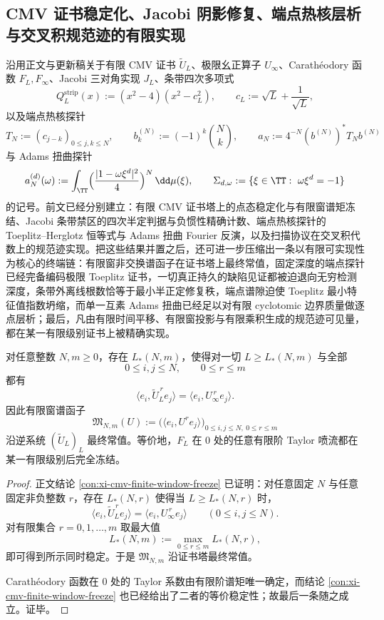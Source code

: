 \subsection{CMV 证书稳定化、Jacobi 阴影修复、端点热核层析与交叉积规范迹的有限实现}\label{subsec:conclusion-cmv-jacobi-adams-crossedproduct-finite-realization}
沿用正文与更新稿关于有限 CMV 证书 \(\widetilde U_L\)、极限幺正算子 \(U_\infty\)、Carath\'eodory 函数 \(F_L,F_\infty\)、Jacobi 三对角实现 \(J_L\)、条带四次多项式
\[
Q_L^{\mathrm{strip}}(x):=(x^2-4)(x^2-c_L^2),
\qquad
c_L:=\sqrt L+\frac1{\sqrt L},
\]
以及端点热核探针
\[
T_N:=(c_{j-k})_{0\le j,k\le N},
\qquad
b_k^{(N)}:=(-1)^k\binom Nk,
\qquad
a_N:=4^{-N}(b^{(N)})^\ast T_N b^{(N)}
\]
与 Adams 扭曲探针
\[
a_N^{(d)}(\omega)
:=
\int_{\TT}\Bigl(\frac{|1-\omega\xi^d|^2}{4}\Bigr)^N\,\dd\mu(\xi),
\qquad
\Sigma_{d,\omega}:=\{\xi\in\TT:\ \omega\xi^d=-1\}
\]
的记号。前文已经分别建立：有限 CMV 证书塔上的点态稳定化与有限窗谱矩冻结、Jacobi 条带禁区的四次半定判据与负惯性精确计数、端点热核探针的 Toeplitz--Herglotz 恒等式与 Adams 扭曲 Fourier 反演，以及扫描协议在交叉积代数上的规范迹实现。把这些结果并置之后，还可进一步压缩出一条以有限可实现性为核心的终端链：有限窗非交换谱函子在证书塔上最终常值，固定深度的端点探针已经完备编码极限 Toeplitz 证书，一切真正持久的缺陷见证都被迫退向无穷检测深度，条带外离线根数恰等于最小半正定修复秩，端点谱隙迫使 Toeplitz 最小特征值指数坍缩，而单一互素 Adams 扭曲已经足以对有限 cyclotomic 边界质量做逐点层析；最后，凡由有限时间平移、有限窗投影与有限乘积生成的规范迹可见量，都在某一有限级别证书上被精确实现。

\begin{theorem}\label{thm:conclusion-cmv-finite-window-spectral-functor-finite-representability}
对任意整数 \(N,m\ge 0\)，存在 \(L_\ast(N,m)\)，使得对一切 \(L\ge L_\ast(N,m)\) 与全部
\[
0\le i,j\le N,
\qquad
0\le r\le m
\]
都有
\[
\langle e_i,\widetilde U_L^{\,r}e_j\rangle
=
\langle e_i,U_\infty^{\,r}e_j\rangle.
\]
因此有限窗谱函子
\[
\mathfrak M_{N,m}(U)
:=
\bigl(\langle e_i,U^{r}e_j\rangle\bigr)_{0\le i,j\le N,\ 0\le r\le m}
\]
沿逆系统 \((\widetilde U_L)_L\) 最终常值。等价地，\(F_L\) 在 \(0\) 处的任意有限阶 Taylor 喷流都在某一有限级别后完全冻结。
\end{theorem}
\begin{proof}
正文结论 \ref{con:xi-cmv-finite-window-freeze} 已证明：对任意固定 \(N\) 与任意固定非负整数 \(r\)，存在 \(L_\ast(N,r)\) 使得当 \(L\ge L_\ast(N,r)\) 时，
\[
\langle e_i,\widetilde U_L^{\,r}e_j\rangle
=
\langle e_i,U_\infty^{\,r}e_j\rangle
\qquad(0\le i,j\le N).
\]
对有限集合 \(r=0,1,\dots,m\) 取最大值
\[
L_\ast(N,m):=\max_{0\le r\le m}L_\ast(N,r),
\]
即可得到所示同时稳定。于是 \(\mathfrak M_{N,m}\) 沿证书塔最终常值。

Carath\'eodory 函数在 \(0\) 处的 Taylor 系数由有限阶谱矩唯一确定，而结论 \ref{con:xi-cmv-finite-window-freeze} 也已经给出了二者的等价稳定性；故最后一条随之成立。证毕。
\end{proof}

